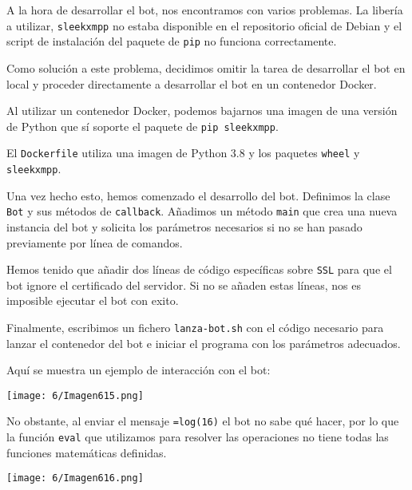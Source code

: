 A la hora de desarrollar el bot, nos encontramos con varios problemas.
La libería a utilizar, \Verb#sleekxmpp# no estaba disponible en el repositorio
oficial de Debian y el script de instalación del paquete de \Verb#pip# no funciona correctamente.

Como solución a este problema, decidimos omitir la tarea de desarrollar el bot en local
y proceder directamente a desarrollar el bot en un contenedor Docker.

Al utilizar un contenedor Docker, podemos bajarnos una imagen de una versión de Python que sí soporte
el paquete de \Verb#pip sleekxmpp#.

El \Verb#Dockerfile# utiliza una imagen de Python 3.8
y los paquetes \Verb#wheel# y \Verb#sleekxmpp#.

Una vez hecho esto, hemos comenzado el desarrollo del bot.
Definimos la clase \Verb#Bot# y sus métodos de \Verb#callback#.
Añadimos un método \Verb#main# que crea una nueva instancia del bot
y solicita los parámetros necesarios si no se han pasado previamente
por línea de comandos.

Hemos tenido que añadir dos líneas de código específicas sobre \Verb#SSL#
para que el bot ignore el certificado del servidor.
Si no se añaden estas líneas, nos es imposible ejecutar el bot con exito.

Finalmente, escribimos un fichero \Verb#lanza-bot.sh# con el código necesario
para lanzar el contenedor del bot e iniciar el programa con los parámetros adecuados.

Aquí se muestra un ejemplo de interacción con el bot: \\
\begin{minipage}{\linewidth}
	\centering
	\texttt{[image: 6/Imagen615.png]}
	\label{fig:6/6}
\end{minipage}

No obstante, al enviar el mensaje \verb#=log(16)#
el bot no sabe qué hacer, por lo que la función \verb#eval#
que utilizamos para resolver las operaciones no tiene todas
las funciones matemáticas definidas.

\begin{minipage}{\linewidth}
	\centering
	\texttt{[image: 6/Imagen616.png]}
	\label{fig:6/7}
\end{minipage}
